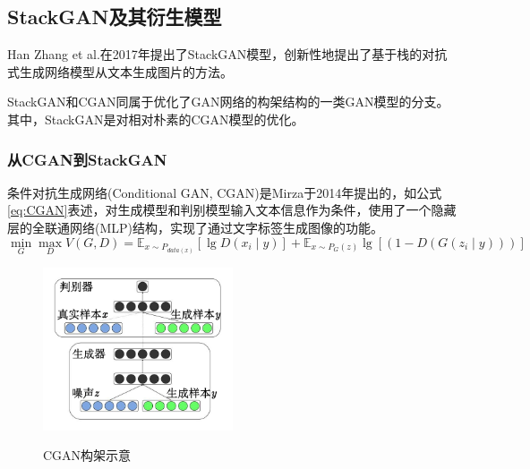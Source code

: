\subsection{StackGAN及其衍生模型}
Han Zhang et al.在2017年提出了StackGAN模型，创新性地提出了基于栈的对抗式生成网络模型从文本生成图片的方法。

StackGAN和CGAN同属于优化了GAN网络的构架结构的一类GAN模型的分支。其中，StackGAN是对相对朴素的CGAN模型的优化。

\subsubsection{从CGAN到StackGAN}
条件对抗生成网络(Conditional GAN, CGAN)是Mirza于2014年提出的，如公式\eqref{eq:CGAN}表述，对生成模型和判别模型输入文本信息作为条件，使用了一个隐藏层的全联通网络(MLP)结构，实现了通过文字标签生成图像的功能。
\begin{equation}
  \min_G\max_DV(G,D)=\mathbb{E}_{x\sim P_{data(x)}}[\lg D(x_i\mid y)]+\mathbb{E}_{x\sim P_G(z)}\lg [(1−D(G(z_i\mid y)))]
  \label{eq:CGAN}
\end{equation}

\begin{figure}[t]
  \centering
  \includegraphics[width=0.5\textwidth]{figures/cgan.jpg}\\
  \caption{CGAN构架示意}
  \label{fig:CGAN}
\end{figure}

